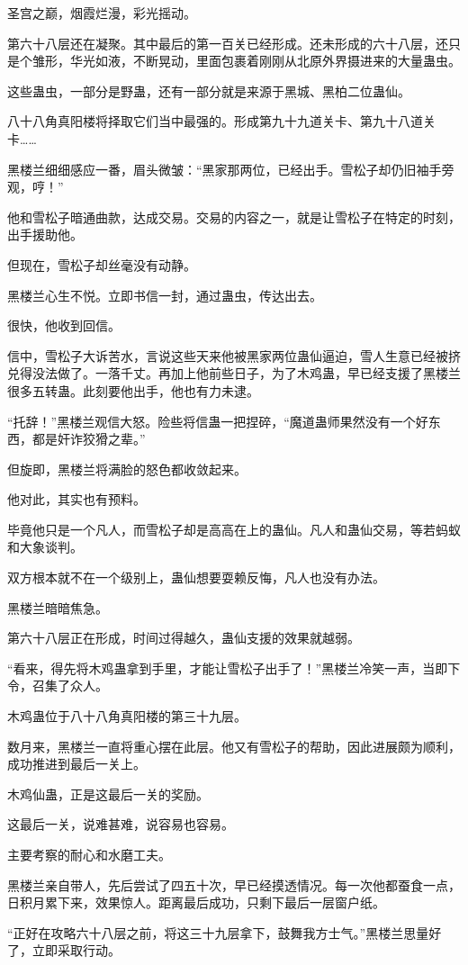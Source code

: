 \begin{this_body}
圣宫之巅，烟霞烂漫，彩光摇动。

第六十八层还在凝聚。其中最后的第一百关已经形成。还未形成的六十八层，还只是个雏形，华光如液，不断晃动，里面包裹着刚刚从北原外界摄进来的大量蛊虫。

这些蛊虫，一部分是野蛊，还有一部分就是来源于黑城、黑柏二位蛊仙。

八十八角真阳楼将择取它们当中最强的。形成第九十九道关卡、第九十八道关卡……

黑楼兰细细感应一番，眉头微皱：“黑家那两位，已经出手。雪松子却仍旧袖手旁观，哼！”

他和雪松子暗通曲款，达成交易。交易的内容之一，就是让雪松子在特定的时刻，出手援助他。

但现在，雪松子却丝毫没有动静。

黑楼兰心生不悦。立即书信一封，通过蛊虫，传达出去。

很快，他收到回信。

信中，雪松子大诉苦水，言说这些天来他被黑家两位蛊仙逼迫，雪人生意已经被挤兑得没法做了。一落千丈。再加上他前些日子，为了木鸡蛊，早已经支援了黑楼兰很多五转蛊。此刻要他出手，他也有力未逮。

“托辞！”黑楼兰观信大怒。险些将信蛊一把捏碎，“魔道蛊师果然没有一个好东西，都是奸诈狡猾之辈。”

但旋即，黑楼兰将满脸的怒色都收敛起来。

他对此，其实也有预料。

毕竟他只是一个凡人，而雪松子却是高高在上的蛊仙。凡人和蛊仙交易，等若蚂蚁和大象谈判。

双方根本就不在一个级别上，蛊仙想要耍赖反悔，凡人也没有办法。

黑楼兰暗暗焦急。

第六十八层正在形成，时间过得越久，蛊仙支援的效果就越弱。

“看来，得先将木鸡蛊拿到手里，才能让雪松子出手了！”黑楼兰冷笑一声，当即下令，召集了众人。

木鸡蛊位于八十八角真阳楼的第三十九层。

数月来，黑楼兰一直将重心摆在此层。他又有雪松子的帮助，因此进展颇为顺利，成功推进到最后一关上。

木鸡仙蛊，正是这最后一关的奖励。

这最后一关，说难甚难，说容易也容易。

主要考察的耐心和水磨工夫。

黑楼兰亲自带人，先后尝试了四五十次，早已经摸透情况。每一次他都蚕食一点，日积月累下来，效果惊人。距离最后成功，只剩下最后一层窗户纸。

“正好在攻略六十八层之前，将这三十九层拿下，鼓舞我方士气。”黑楼兰思量好了，立即采取行动。


\end{this_body}
